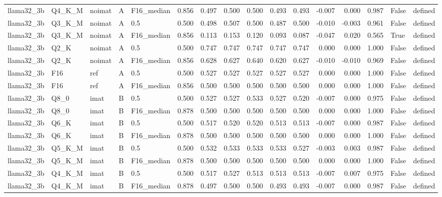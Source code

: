 \begin{tabular}{lllllrrrrrrrrrll}
llama32\_3b & Q4\_K\_M & noimat & A & F16\_median & 0.856 & 0.497 & 0.500 & 0.500 & 0.493 & 0.493 & -0.007 & 0.000 & 0.987 & False & defined \\
llama32\_3b & Q3\_K\_M & noimat & A & 0.5 & 0.500 & 0.498 & 0.507 & 0.500 & 0.487 & 0.500 & -0.010 & -0.003 & 0.961 & False & defined \\
llama32\_3b & Q3\_K\_M & noimat & A & F16\_median & 0.856 & 0.113 & 0.153 & 0.120 & 0.093 & 0.087 & -0.047 & 0.020 & 0.565 & True & defined \\
llama32\_3b & Q2\_K & noimat & A & 0.5 & 0.500 & 0.747 & 0.747 & 0.747 & 0.747 & 0.747 & 0.000 & 0.000 & 1.000 & False & defined \\
llama32\_3b & Q2\_K & noimat & A & F16\_median & 0.856 & 0.628 & 0.627 & 0.640 & 0.620 & 0.627 & -0.010 & -0.010 & 0.969 & False & defined \\
llama32\_3b & F16 & ref & A & 0.5 & 0.500 & 0.527 & 0.527 & 0.527 & 0.527 & 0.527 & 0.000 & 0.000 & 1.000 & False & defined \\
llama32\_3b & F16 & ref & A & F16\_median & 0.856 & 0.500 & 0.500 & 0.500 & 0.500 & 0.500 & 0.000 & 0.000 & 1.000 & False & defined \\
llama32\_3b & Q8\_0 & imat & B & 0.5 & 0.500 & 0.527 & 0.527 & 0.533 & 0.527 & 0.520 & -0.007 & 0.000 & 0.975 & False & defined \\
llama32\_3b & Q8\_0 & imat & B & F16\_median & 0.878 & 0.500 & 0.500 & 0.500 & 0.500 & 0.500 & 0.000 & 0.000 & 1.000 & False & defined \\
llama32\_3b & Q6\_K & imat & B & 0.5 & 0.500 & 0.517 & 0.520 & 0.520 & 0.513 & 0.513 & -0.007 & 0.000 & 0.987 & False & defined \\
llama32\_3b & Q6\_K & imat & B & F16\_median & 0.878 & 0.500 & 0.500 & 0.500 & 0.500 & 0.500 & 0.000 & 0.000 & 1.000 & False & defined \\
llama32\_3b & Q5\_K\_M & imat & B & 0.5 & 0.500 & 0.532 & 0.533 & 0.533 & 0.533 & 0.527 & -0.003 & 0.003 & 0.987 & False & defined \\
llama32\_3b & Q5\_K\_M & imat & B & F16\_median & 0.878 & 0.500 & 0.500 & 0.500 & 0.500 & 0.500 & 0.000 & 0.000 & 1.000 & False & defined \\
llama32\_3b & Q4\_K\_M & imat & B & 0.5 & 0.500 & 0.517 & 0.527 & 0.513 & 0.513 & 0.513 & -0.007 & 0.007 & 0.975 & False & defined \\
llama32\_3b & Q4\_K\_M & imat & B & F16\_median & 0.878 & 0.497 & 0.500 & 0.500 & 0.493 & 0.493 & -0.007 & 0.000 & 0.987 & False & defined \\

\end{tabular}
